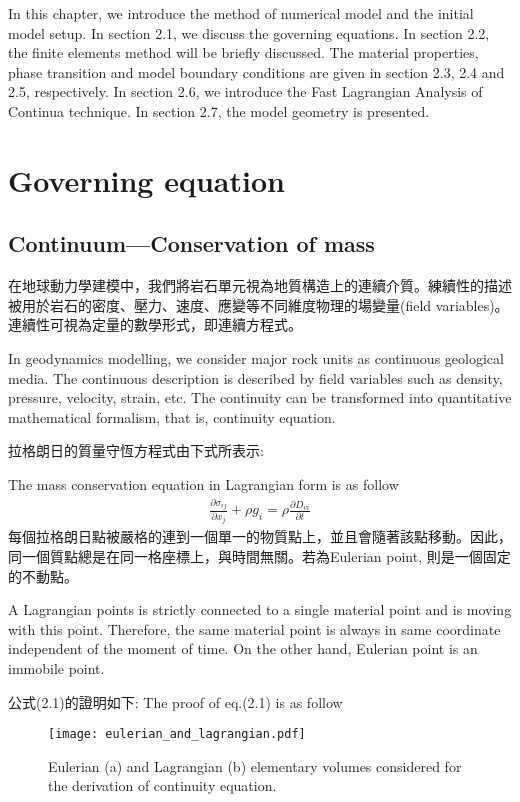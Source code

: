 In this chapter, we introduce the method of numerical model and the initial model setup. In section 2.1, we discuss the governing equations. In section 2.2, the finite elements method will be briefly discussed. The material properties, phase transition and model boundary conditions are given in section 2.3, 2.4 and 2.5, respectively. In section 2.6, we introduce the Fast Lagrangian Analysis of Continua technique. In section 2.7, the model geometry is presented. 

\section{Governing equation}

\subsection{Continuum---Conservation of mass}

在地球動力學建模中，我們將岩石單元視為地質構造上的連續介質。練續性的描述被用於岩石的密度、壓力、速度、應變等不同維度物理的場變量(field variables)。連續性可視為定量的數學形式，即連續方程式。


In geodynamics modelling, we consider major rock units as continuous geological media. The continuous description is described by field variables such as density, pressure, velocity, strain, etc. 
The continuity can be transformed into quantitative mathematical formalism, that is, continuity equation.

拉格朗日的質量守恆方程式由下式所表示:

The mass conservation equation in Lagrangian form is as follow
\begin{align}
\frac{\partial \sigma_{ij}}{\partial x_j}+\rho g_i = \rho \frac{\partial D_{vi}}{\partial t} 
\end{align}
每個拉格朗日點被嚴格的連到一個單一的物質點上，並且會隨著該點移動。因此，同一個質點總是在同一格座標上，與時間無關。若為Eulerian point, 則是一個固定的不動點。

A Lagrangian points is strictly connected to a single material point and is moving with this point. Therefore, the same material point is always in same coordinate independent of the moment of time. On the other hand, Eulerian point is an immobile point.

公式(2.1)的證明如下:
The proof of eq.(2.1) is as follow
\begin{figure*}[ht!]
    \centering
    \texttt{[image: eulerian\_and\_lagrangian.pdf]}
    \caption{ Eulerian (a) and Lagrangian (b) elementary volumes considered for the derivation of continuity equation. }
    \label{fig::Lagrangian Volume}
\end{figure*}
 
